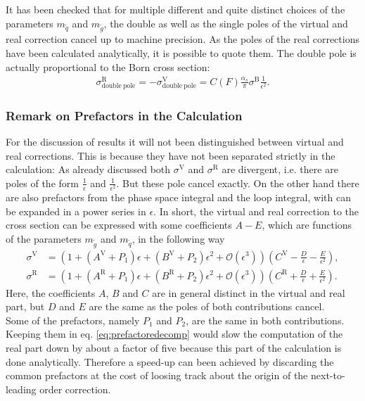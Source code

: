 It has been checked that for multiple different and quite distinct choices of the parameters $m_{\tilde{q}}$ and $m_{\tilde{g}}$, the double as well as the single poles of the virtual and real correction cancel up to machine precision. As the poles of the real corrections have been calculated analytically, it is possible to quote them. The double pole is actually proportional to the Born cross section:
\begin{align}
\sigma^{\mathrm{R}}_{\mathrm{double\ pole}} = -\sigma^{\mathrm{V}}_{\mathrm{double\ pole}} = C(F)\frac{\alpha_s}{\pi}\sigma^{\mathrm{B}} \frac{1}{\epsilon^2}.
\end{align}

\subsubsection{Remark on Prefactors in the Calculation}
For the discussion of results it will not been distinguished between virtual and real corrections. This is because they have not been separated strictly in the calculation: As already discussed both $\sigma^{\mathrm{V}}$ and $\sigma^{\mathrm{R}}$ are divergent, i.e. there are poles of the form $\frac{1}{\epsilon}$ and $\frac{1}{\epsilon^2}$. But these pole cancel exactly. On the other hand there are also prefactors from the phase space integral and the loop integral, with can be expanded in a power series in $\epsilon$. In short, the virtual and real correction to the cross section can be expressed with some coefficients $A - E$, which are functions of the parameters $m_{\tilde{g}}$ and $m_{\tilde{q}}$, in the following way
\begin{align}
\sigma^{\mathrm{V}} &= \left( 1 + (A^{\mathrm{V}} + P_1)\epsilon + (B^{\mathrm{V}} + P_2)\epsilon^2 + \mathcal{O}(\epsilon^3) \right)\left( C^{\mathrm{V}} - \frac{D}{\epsilon} - \frac{E}{\epsilon^2} \right),\\
\sigma^{\mathrm{R}} &= \left( 1 + (A^{\mathrm{R}} + P_1)\epsilon + (B^{\mathrm{R}} + P_2)\epsilon^2 + \mathcal{O}(\epsilon^3) \right)\left( C^{\mathrm{R}} + \frac{D}{\epsilon} + \frac{E}{\epsilon^2} \right).\label{eq:prefactoredecomp}
\end{align}
Here, the coefficients $A$, $B$ and $C$ are in general distinct in the virtual and real part, but $D$ and $E$ are the same as the poles of both contributions cancel.\\
Some of the prefactors, namely $P_1$ and $P_2$, are the same in both contributions. Keeping them in eq. \eqref{eq:prefactoredecomp} would slow the computation of the real part down by about a factor of five because this part of the calculation is done analytically. Therefore a speed-up can been achieved by discarding the common prefactors at the cost of loosing track about the origin of the next-to-leading order correction.\\
